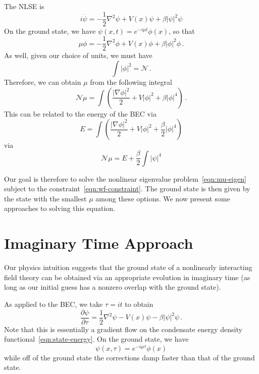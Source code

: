 \documentclass{revtex4}
\newcommand{\abs}[1]{\ensuremath{\left|#1\right|}}
\begin{document}
The NLSE is
\begin{equation}
  i\dot{\psi} = -\frac{1}{2}\nabla^2\psi + V(x)\psi + \beta\abs{\psi}^2\psi
\end{equation}
On the ground state, we have $\psi(x,t) = e^{-i\mu t}\phi(x)$, so that
\begin{equation}\label{eqn:mu-eigen}
  \mu\phi = -\frac{1}{2}\nabla^2\phi + V(x)\phi + \beta\abs{\phi}^2\phi \, .
\end{equation}
As well, given our choice of units, we must have
\begin{equation}\label{eqn:wf-constraint}
  \int \abs{\phi}^2 = \mathcal{N} \, .
\end{equation}
Therefore, we can obtain $\mu$ from the following integral
\begin{equation}\label{eqn:mu-integral}
  \mathcal{N}\mu = \int\left(\frac{\abs{\nabla\phi}^2}{2} + V\abs{\phi}^2 + \beta\abs{\phi}^4 \right) \, .
\end{equation}
This can be related to the energy of the BEC via
\begin{equation}\label{eqn:state-energy}
  E = \int\left(\frac{\abs{\nabla\phi}^2}{2} + V\abs{\phi}^2 + \frac{\beta}{2}\abs{\phi}^4 \right) 
\end{equation}
via
\begin{equation}
  \mathcal{N}\mu = E + \frac{\beta}{2}\int\abs{\psi}^4
\end{equation}

Our goal is therefore to solve the nonlinear eigenvalue problem~\eqref{eqn:mu-eigen} subject to the constraint~\eqref{eqn:wf-constraint}.
The ground state is then given by the state with the smallest $\mu$ among these options.
We now present some approaches to solving this equation.

\section{Imaginary Time Approach}
Our physics intuition suggests that the ground state of a nonlinearly interacting field theory can be obtained via an appropriate evolution in imaginary time (as long as our initial guess has a nonzero overlap with the ground state).

As applied to the BEC, we take $\tau = it$ to obtain
\begin{equation}
  \frac{\partial\psi}{\partial \tau} = \frac{1}{2}\nabla^2\psi - V(x)\psi - \beta |\psi|^2\psi \, .
\end{equation}
Note that this is essentially a gradient flow on the condensate energy density functional~\eqref{eqn:state-energy}.
On the ground state, we have
\begin{equation}
  \psi(x,\tau) = e^{-i\mu\tau}\phi(x)
\end{equation}
while off of the ground state the corrections damp faster than that of the ground state.
\end{document}
